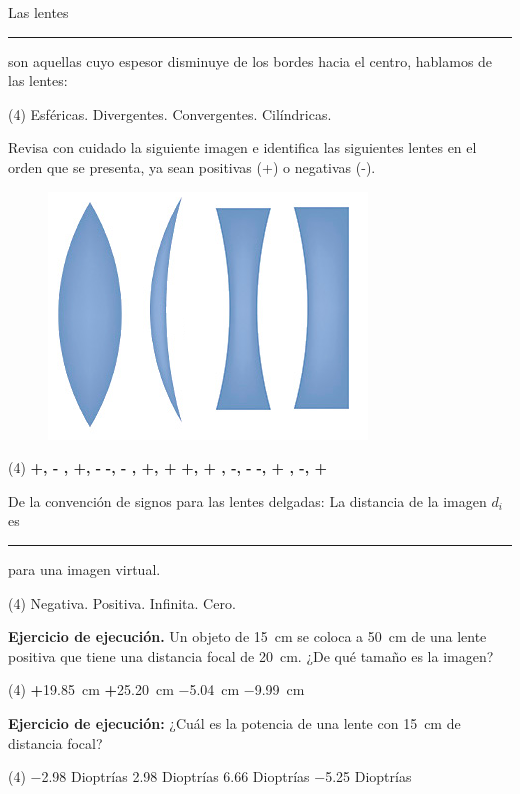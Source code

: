 \documentclass[12pt, letter]{exam}
\begin{document}
\begin{questions}
    \question Las lentes \rule{2.5cm}{0.1mm} son aquellas cuyo espesor disminuye de los bordes hacia el centro, hablamos de las lentes:
    \begin{tasks}(4)
        \task Esféricas.
        \task Divergentes.
        \task Convergentes.
        \task Cilíndricas.
    \end{tasks}
    \question Revisa con cuidado la siguiente imagen e identifica las siguientes lentes en el orden que se presenta, ya sean positivas (+) o negativas (-).
    \begin{figure}[H]
        \centering
        \includegraphics[scale=2]{Imagenes/Arreglo_Lentes_02.png}
    \end{figure}
    \begin{tasks}(4)
        \task \textbf{+, - , +, -}
        \task \textbf{-, - , +, +} 
        \task \textbf{+, + , -, -} 
        \task \textbf{-, + , -, +} 
    \end{tasks}
    \question De la convención de signos para las lentes delgadas:  La distancia de la imagen $d_{i}$ es \rule{2cm}{0.1mm} para una imagen virtual.
    \begin{tasks}(4)
        \task Negativa.
        \task Positiva.
        \task Infinita.
        \task Cero.
    \end{tasks}
    \question \label{Ejercicio_07} \textbf{Ejercicio de ejecución. } Un objeto de \SI{15}{\centi\meter} se coloca a \SI{50}{\centi\meter} de una lente positiva que tiene una distancia focal de \SI{20}{\centi\meter}. ¿De qué tamaño es la imagen?

    \vspace{0.3cm}
    \begin{tasks}(4)
        \task \textbf{+}\SI{19.85}{\centi\meter}
        \task \textbf{+}\SI{25.20}{\centi\meter}
        \task \SI{-5.04}{\centi\meter}
        \task \SI{-9.99}{\centi\meter}
    \end{tasks}
    \question \label{Ejercicio_08} \textbf{Ejercicio de ejecución: } ¿Cuál es la potencia de una lente con \SI{15}{\centi\meter} de distancia focal?
    \begin{tasks}(4)
        \task \num{-2.98} Dioptrías
        \task \num{2.98} Dioptrías
        \task \num{6.66} Dioptrías
        \task \num{-5.25} Dioptrías
    \end{tasks}


\end{questions}
\end{document}

